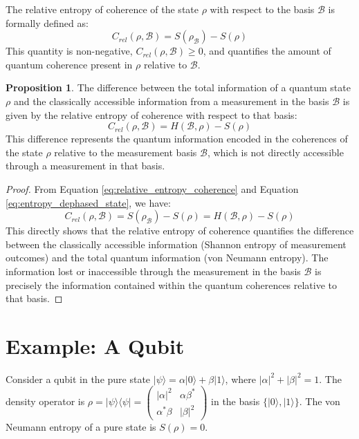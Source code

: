 \documentclass{article}
\theoremstyle{definition}
\newtheorem{proposition}[definition]{Proposition}
\begin{document}
	The relative entropy of coherence of the state $\rho$ with respect to the basis $\mathcal{B}$ is formally defined as:
	\begin{equation}
		C_{rel}(\rho, \mathcal{B}) = S(\rho_{\mathcal{B}}) - S(\rho)
		\label{eq:relative_entropy_coherence}
	\end{equation}
	This quantity is non-negative, $C_{rel}(\rho, \mathcal{B}) \ge 0$, and quantifies the amount of quantum coherence present in $\rho$ relative to $\mathcal{B}$.
	
	\begin{proposition}
		The difference between the total information of a quantum state $\rho$ and the classically accessible information from a measurement in the basis $\mathcal{B}$ is given by the relative entropy of coherence with respect to that basis:
		$$C_{rel}(\rho, \mathcal{B}) = H(\mathcal{B}, \rho) - S(\rho)$$
		This difference represents the quantum information encoded in the coherences of the state $\rho$ relative to the measurement basis $\mathcal{B}$, which is not directly accessible through a measurement in that basis.
	\end{proposition}
	\begin{proof}
		From Equation \eqref{eq:relative_entropy_coherence} and Equation \eqref{eq:entropy_dephased_state}, we have:
		$$C_{rel}(\rho, \mathcal{B}) = S(\rho_{\mathcal{B}}) - S(\rho) = H(\mathcal{B}, \rho) - S(\rho)$$
		This directly shows that the relative entropy of coherence quantifies the difference between the classically accessible information (Shannon entropy of measurement outcomes) and the total quantum information (von Neumann entropy). The information lost or inaccessible through the measurement in the basis $\mathcal{B}$ is precisely the information contained within the quantum coherences relative to that basis.
	\end{proof}
	
	\section{Example: A Qubit}
	
	Consider a qubit in the pure state $|\psi\rangle = \alpha |0\rangle + \beta |1\rangle$, where $|\alpha|^2 + |\beta|^2 = 1$. The density operator is $\rho = |\psi\rangle\langle\psi| = \begin{pmatrix} |\alpha|^2 & \alpha \beta^* \\ \alpha^* \beta & |\beta|^2 \end{pmatrix}$ in the basis $\{|0\rangle, |1\rangle\}$. The von Neumann entropy of a pure state is $S(\rho) = 0$.
	
\end{document}
